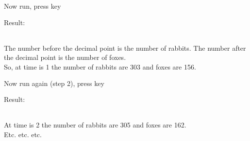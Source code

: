 \documentclass[a4paper, landscape]{article}
\begin{document}
\bigskip
Now run, press key \Rdownfoc

\bigskip
Result:\\
\tt {} \\ \rm

\noindent
The number before the decimal point is the number of rabbits.
The number after the decimal point is the number of foxes.\\
So, at time is 1 the number of rabbits are 303 and foxes are 156.

\bigskip
Now run again (step 2), press key \Rdownfoc

\bigskip
Result:\\
\tt {} \\ \rm

At time is 2 the number of rabbits are 305 and foxes are 162.\\
\indent Etc. etc. etc.

\bigskip
\end{document}
